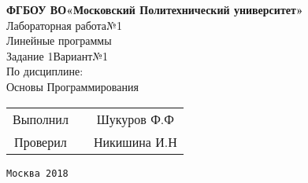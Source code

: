 \documentclass[a4paper]{article}
\begin{document}
\begin{center}
\hfill \break
\large{\textbf{ФГБОУ ВО«Московский Политехнический университет»}}\\
\hfill \break
\hfill \break
\hfill \break
\hfill \break
\hfill \break
\hfill \break
\hfill \break
\large{Лабораторная работа№1}\\
\footnotesize{Линейные программы\\
Задание 1\hspace{3cm}Вариант№1\break\\
По дисциплине:\\
Основы Программирования
}
\end{center}
\hfill \break
\hfill \break
\hfill \break
\hfill \break
\hfill \break
\hfill \break
\hfill \break
\hfill \break
\hfill \break
\hfill \break
\normalsize{ 
\begin{tabular}{ccc}
\hspace{4cm}Выполнил & \underline{\hspace{3cm}} & Шукуров Ф.Ф\\
\hspace{4cm}Проверил & \underline{\hspace{3cm}}& Никишина И.Н
\end{tabular}
}
\hfill \break
\hfill \break
\hfill \break
\hfill \break
\hfill \break
\hfill \break
\hfill \break
\hfill \break
\hfill \break
\hfill \break
\hfill \break
\hfill \break
\begin{center}\texttt{Москва 2018}\end{center}
\thispagestyle{empty}
\end{document}

